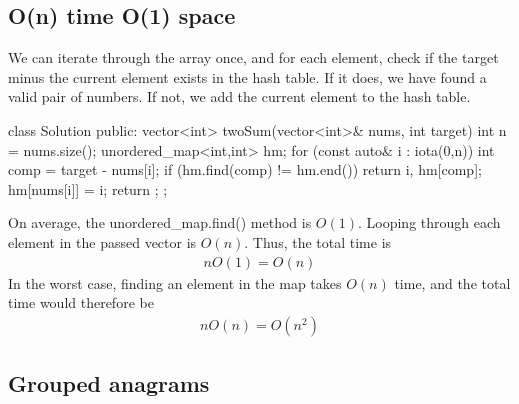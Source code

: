\documentclass{report}
\begin{document}
    \subsection{O(n) time O(1) space}
    \bigbreak \noindent 
    We can iterate through the array once, and for each element, check if the target minus the current element exists in the hash table. If it does, we have found a valid pair of numbers. If not, we add the current element to the hash table.
    \bigbreak \noindent 
    \begin{cppcode}
        class Solution {
            public:
            vector<int> twoSum(vector<int>& nums, int target) {
                int n = nums.size();
                unordered_map<int,int> hm;
                for (const auto& i : iota(0,n)) {
                    int comp = target - nums[i];
                    if (hm.find(comp) != hm.end()) {
                        return {i, hm[comp]};
                    }
                    hm[nums[i]] = i;
                }
                return {};
            }
        };
    \end{cppcode}
    \bigbreak \noindent 
    On average, the unordered\_map.find() method is $O(1)$. Looping through each element in the passed vector is $O(n)$. Thus, the total time is 
    \begin{align*}
        nO(1) = O(n)
    \end{align*}
    In the worst case, finding an element in the map takes $O(n)$ time, and the total time would therefore be 
    \begin{align*}
        nO(n) = O(n^{2})
    \end{align*}

    \bigbreak \noindent 
    \subsection{Grouped anagrams}
    \bigbreak \noindent 
\end{document}

